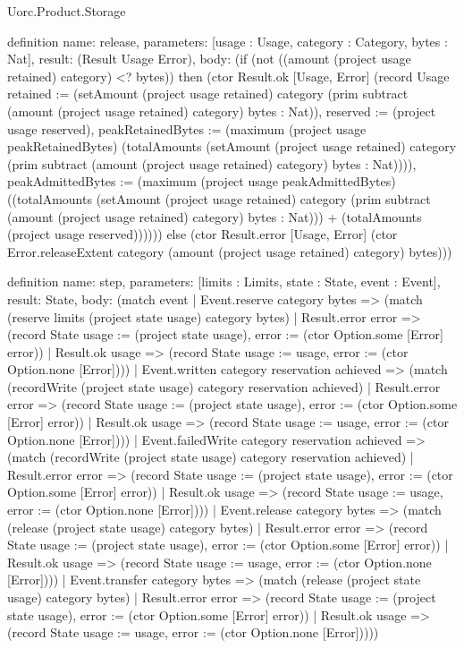 \begin{lexlean}{Uorc.Product.Storage}
\begin{semanticmodule}
definition{
  name: release,
  parameters: [usage : Usage, category : Category, bytes : Nat],
  result: (Result Usage Error),
  body: (if (not ((amount (project usage retained) category) <? bytes)) then (ctor Result.ok [Usage, Error] (record Usage {retained := (setAmount (project usage retained) category (prim subtract (amount (project usage retained) category) bytes : Nat)), reserved := (project usage reserved), peakRetainedBytes := (maximum (project usage peakRetainedBytes) (totalAmounts (setAmount (project usage retained) category (prim subtract (amount (project usage retained) category) bytes : Nat)))), peakAdmittedBytes := (maximum (project usage peakAdmittedBytes) ((totalAmounts (setAmount (project usage retained) category (prim subtract (amount (project usage retained) category) bytes : Nat))) + (totalAmounts (project usage reserved))))})) else (ctor Result.error [Usage, Error] (ctor Error.releaseExtent category (amount (project usage retained) category) bytes)))
}

definition{
  name: step,
  parameters: [limits : Limits, state : State, event : Event],
  result: State,
  body: (match event
    | Event.reserve category bytes => (match (reserve limits (project state usage) category bytes)
      | Result.error error => (record State {usage := (project state usage), error := (ctor Option.some [Error] error)})
      | Result.ok usage => (record State {usage := usage, error := (ctor Option.none [Error])}))
    | Event.written category reservation achieved => (match (recordWrite (project state usage) category reservation achieved)
      | Result.error error => (record State {usage := (project state usage), error := (ctor Option.some [Error] error)})
      | Result.ok usage => (record State {usage := usage, error := (ctor Option.none [Error])}))
    | Event.failedWrite category reservation achieved => (match (recordWrite (project state usage) category reservation achieved)
      | Result.error error => (record State {usage := (project state usage), error := (ctor Option.some [Error] error)})
      | Result.ok usage => (record State {usage := usage, error := (ctor Option.none [Error])}))
    | Event.release category bytes => (match (release (project state usage) category bytes)
      | Result.error error => (record State {usage := (project state usage), error := (ctor Option.some [Error] error)})
      | Result.ok usage => (record State {usage := usage, error := (ctor Option.none [Error])}))
    | Event.transfer category bytes => (match (release (project state usage) category bytes)
      | Result.error error => (record State {usage := (project state usage), error := (ctor Option.some [Error] error)})
      | Result.ok usage => (record State {usage := usage, error := (ctor Option.none [Error])})))
}


\end{semanticmodule}
\end{lexlean}
